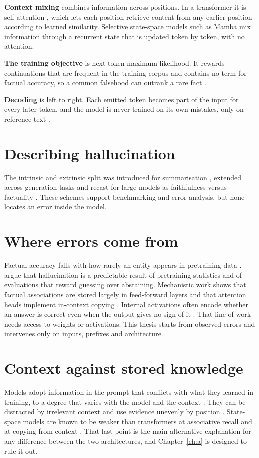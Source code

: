 \documentclass[11pt,a4paper,oneside]{report}
\begin{document}
\textbf{Context mixing} combines information across positions. In a transformer it is self-attention \citep{vaswani2017}, which lets each position retrieve content from any earlier position according to learned similarity. Selective state-space models such as Mamba \citep{gu2024mamba} mix information through a recurrent state that is updated token by token, with no attention.

\textbf{The training objective} is next-token maximum likelihood. It rewards continuations that are frequent in the training corpus and contains no term for factual accuracy, so a common falsehood can outrank a rare fact \citep{lin2022,kalai2025}.

\textbf{Decoding} is left to right. Each emitted token becomes part of the input for every later token, and the model is never trained on its own mistakes, only on reference text \citep{bengio2015,ranzato2016}.

\section{Describing hallucination}
The intrinsic and extrinsic split was introduced for summarisation \citep{maynez2020}, extended across generation tasks \citep{ji2023} and recast for large models as faithfulness versus factuality \citep{huang2025}. These schemes support benchmarking and error analysis, but none locates an error inside the model.

\section{Where errors come from}
Factual accuracy falls with how rarely an entity appears in pretraining data \citep{kandpal2023,mallen2023}. \citet{kalai2025} argue that hallucination is a predictable result of pretraining statistics and of evaluations that reward guessing over abstaining. Mechanistic work shows that factual associations are stored largely in feed-forward layers \citep{geva2021,meng2022} and that attention heads implement in-context copying \citep{olsson2022}. Internal activations often encode whether an answer is correct even when the output gives no sign of it \citep{kadavath2022,azaria2023}. That line of work needs access to weights or activations. This thesis starts from observed errors and intervenes only on inputs, prefixes and architecture.

\section{Context against stored knowledge}
Models adopt information in the prompt that conflicts with what they learned in training, to a degree that varies with the model and the context \citep{longpre2021,xie2024}. They can be distracted by irrelevant context \citep{shi2023} and use evidence unevenly by position \citep{liu2024}. State-space models are known to be weaker than transformers at associative recall and at copying from context \citep{arora2024,jelassi2024}. That last point is the main alternative explanation for any difference between the two architectures, and Chapter~\ref{ch:a} is designed to rule it out.
\end{document}
